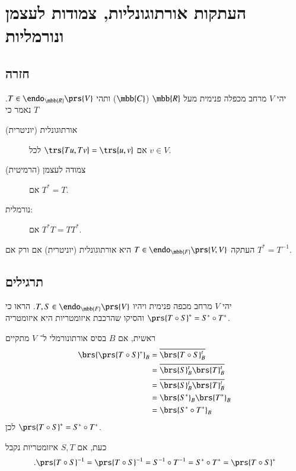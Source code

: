 \documentclass[a4paper,10pt,oneside,openany]{article}
\begin{document}
\section{העתקות אורתוגונליות, צמודות לעצמן ונורמליות}

\subsection{חזרה}

\begin{definition}
יהי
$V$
מרחב מכפלה פנימית מעל
$\mbb{R}$
($\mbb{C}$)
ותהי
$T \in \endo_{\mbb{R}}\prs{V}$.
נאמר כי
$T$
\begin{description}
\item[אורתוגונלית (יוניטרית)]
אם
$\trs{Tu, Tv} = \trs{u,v}$
לכל
$v \in V$.
\item[צמודה לעצמן (הרמיטית)]
אם
$T^* = T$.
\item[נורמלית:]
אם
$T^* T = T T^*$.
\end{description}
\end{definition}

\begin{remark}
העתקה
$T \in \endo_{\mbb{F}}\prs{V,V}$
היא
אורתוגונלית (יוניטרית) אם ורק אם
$T^* = T^{-1}$.
\end{remark}

\subsection{תרגילים}

\begin{exercise}
יהי
$V$
מרחב מכפה פנימית ויהיו
$T,S \in \endo_{\mbb{F}}\prs{V}$.
הראו כי
$\prs{T \circ S}^* = S^* \circ T^*$
והסיקו שהרכבת איזומטריות היא איזומטריה.
\end{exercise}

\begin{solution}
ראשית, אם
$B$
בסיס אורתונורמלי ל־%
$V$
מתקיים
\begin{align*}
\brs{\prs{T \circ S}^*}_B &= \overline{\brs{T \circ S}_B^t}
\\&= \overline{\brs{S}_B^t \brs{T}_B^t}
\\&= \overline{\brs{S}_B^t} \overline{\brs{T}_B^t}
\\&= \brs{S^*}_B \brs{T^*}_B
\\&= \brs{S^* \circ T^*}_B
\end{align*}
לכן
$\prs{T \circ S}^* = S^* \circ T^*$.

כעת, אם
$S,T$
איזומטריות נקבל
\[\text{.} \prs{T \circ S}^{-1} = \prs{T \circ S}^{-1} = S^{-1} \circ T^{-1} = S^* \circ T^*  = \prs{T \circ S}^*\]
\end{solution}
\end{document}
